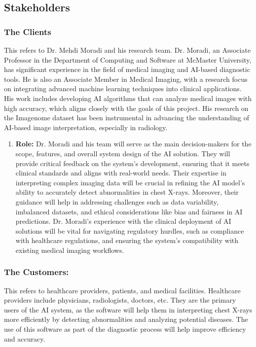 \documentclass[12pt]{article}
\begin{document}
\subsection{Stakeholders}
\subsubsection{The Clients} 
This refers to Dr. Mehdi Moradi and his research team. Dr. Moradi, an Associate Professor in the Department of Computing and Software at McMaster University, has significant experience in the field of medical imaging and AI-based diagnostic tools. He is also an Associate Member in Medical Imaging, with a research focus on integrating advanced machine learning techniques into clinical applications. His work includes developing AI algorithms that can analyze medical images with high accuracy, which aligns closely with the goals of this project. His research on the Imagenome dataset has been instrumental in advancing the understanding of AI-based image interpretation, especially in radiology.
\begin{enumerate}
\item \textbf{Role:} Dr. Moradi and his team will serve as the main decision-makers for the scope, features, and overall system design of the AI solution. They will provide critical feedback on the system's development, ensuring that it meets clinical standards and aligns with real-world needs. Their expertise in interpreting complex imaging data will be crucial in refining the AI model's ability to accurately detect abnormalities in chest X-rays. Moreover, their guidance will help in addressing challenges such as data variability, imbalanced datasets, and ethical considerations like bias and fairness in AI predictions. Dr. Moradi's experience with the clinical deployment of AI solutions will be vital for navigating regulatory hurdles, such as compliance with healthcare regulations, and ensuring the system's compatibility with existing medical imaging workflows.
\end{enumerate}
\subsubsection{The Customers:}
This refers to healthcare providers, patients, and medical facilities.
\newline
Healthcare providers include physicians, radiologists, doctors, etc. They are the primary users of the AI system, as the software will help them in interpreting chest X-rays more efficiently by detecting abnormalities and analyzing potential diseases. The use of this software as part of the diagnostic process will help improve efficiency and accuracy.
\end{document}

